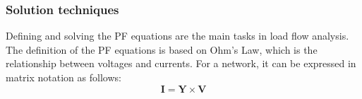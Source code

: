 


\subsubsection{Solution techniques}
Defining and solving the \gls{PF} equations are the main tasks in load flow analysis. \\
The definition of the \gls{PF} equations is based on Ohm’s Law, which is the relationship between voltages and currents. For a network, it can be expressed in matrix notation as follows:
\[
    \mathbf{I} = \mathbf{Y} \times \mathbf{V}
\]
 
